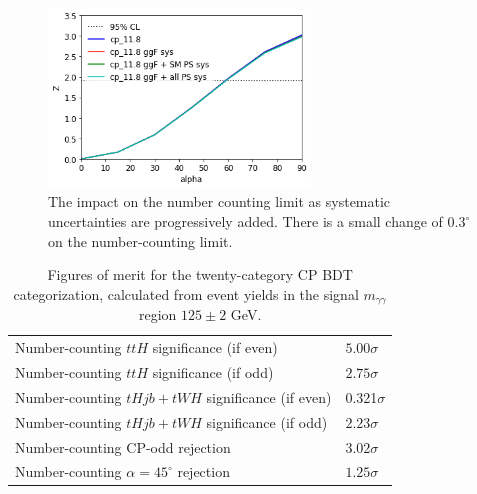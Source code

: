 \begin{figure}
  \centering
        \includegraphics[width=0.62\textwidth]{figures/tthcp_chapter/categorization_xgb/cp_11_syst.png}
  \caption{The impact on the number counting limit as systematic uncertainties are progressively added. There is a small change of $0.3^\circ$ on the number-counting limit. }
  \label{fig:ncrej_syst}
\end{figure}


\begin{table}[ht]
\begin{center}
\begin{tabular}{ll}
Number-counting $ttH$ significance (if even)& $5.00\sigma$  \\
Number-counting $ttH$ significance (if odd)& $2.75\sigma$  \\
Number-counting $tHjb + tWH$ significance (if even)& 0.321$\sigma$  \\
Number-counting $tHjb+tWH$ significance (if odd)& $2.23\sigma$  \\ \hline
Number-counting CP-odd rejection & $3.02\sigma$ \\
Number-counting $\alpha=45^\circ$ rejection & $1.25\sigma$ \\ \hline
\hline
\end{tabular}
\end{center}
\vspace{-0.5cm}
\caption{Figures of merit for the twenty-category CP BDT categorization, calculated from event yields in the signal $m_{\gamma\gamma}$ region $125\pm2$ GeV.}
\label{tab:sigs}
\end{table}
